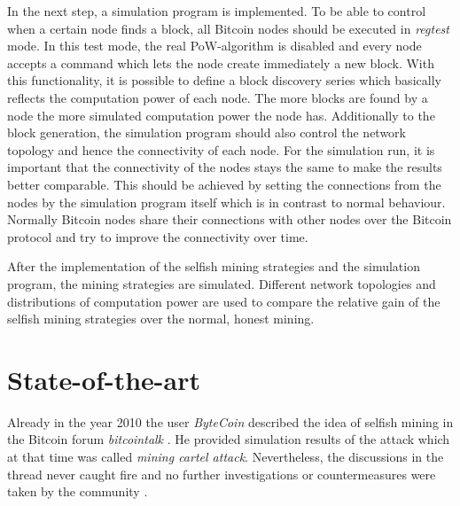 \documentclass{scrartcl}
\begin{document}
In the next step, a simulation program is implemented.
To be able to control when a certain node finds a block, all Bitcoin nodes should be executed in \textit{regtest} mode.
In this test mode, the real PoW-algorithm is disabled and every node accepts a command which lets the node create immediately a new block.
With this functionality, it is possible to define a block discovery series which basically reflects the computation power of each node.
The more blocks are found by a node the more simulated computation power the node has.
Additionally to the block generation, the simulation program should also control the network topology and hence the connectivity of each node.
For the simulation run, it is important that the connectivity of the nodes stays the same to make the results better comparable.
This should be achieved by setting the connections from the nodes by the simulation program itself which is in contrast to normal behaviour.
Normally Bitcoin nodes share their connections with other nodes over the Bitcoin protocol and try to improve the connectivity over time.

After the implementation of the selfish mining strategies and the simulation program, the mining strategies are simulated.
Different network topologies and distributions of computation power are used to compare the relative gain of the selfish mining strategies over the normal, honest mining.

\section{State-of-the-art}
Already in the year 2010 the user \textit{ByteCoin} described the idea of selfish mining in the Bitcoin forum \textit{bitcointalk} \cite{ByteCoin2010}.
He provided simulation results of the attack which at that time was called \textit{mining cartel attack}.
Nevertheless, the discussions in the thread never caught fire and no further investigations or countermeasures were taken by the community \cite{BitcoinTalk2010, bahack2013theoretical}.
\end{document}
